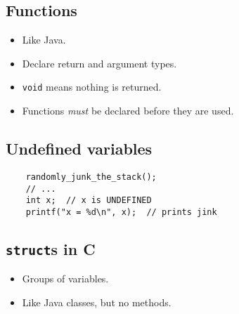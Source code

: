 \subsection{Functions}
\begin{itemize}
	\item Like Java.
	\item Declare return and argument types.
	\item \texttt{void} means nothing is returned.
	\item Functions \emph{must} be declared before they are used.
\end{itemize}

\subsection{Undefined variables}
\begin{verbatim}
	randomly_junk_the_stack();
	// ...
	int x;  // x is UNDEFINED
	printf("x = %d\n", x);  // prints jink
\end{verbatim}

\subsection{\texttt{struct}s in C}
\begin{itemize}
	\item Groups of variables.
	\item Like Java classes, but no methods.
\end{itemize}